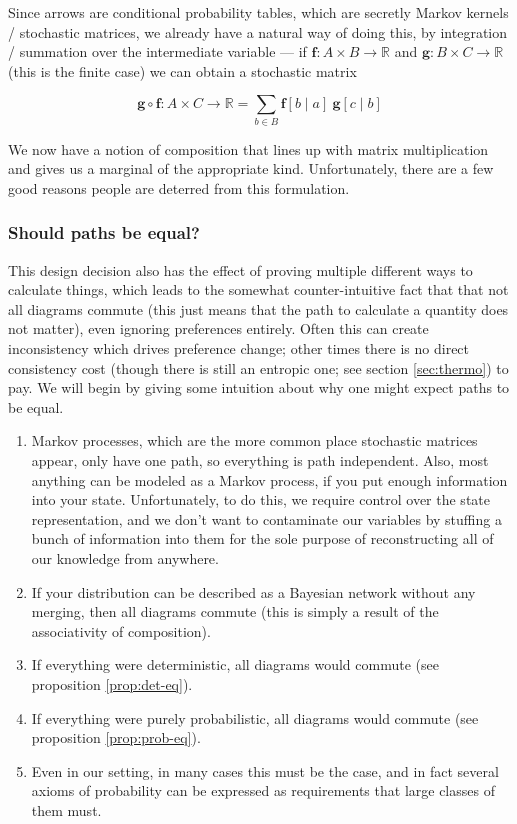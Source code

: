 \documentclass{article}
\begin{document}
	Since arrows are conditional probability tables, which are secretly Markov kernels / stochastic matrices, we already have a natural way of doing this, by integration / summation over the intermediate variable --- if $\mathbf f : A \times B \to \mathbb R$ and $\mathbf g : B \times C \to \mathbb R$ (this is the finite case) we can obtain a stochastic matrix
	
	\[\mathbf g\circ \mathbf f : A \times C \to \mathbb R =  \sum_{b \in B} \mathbf f[ b \mid a]~ \mathbf g[c \mid b] \]
	
	We now have a notion of composition that lines up with matrix multiplication and gives us a marginal of the appropriate kind. Unfortunately, there are a few good reasons people are deterred from this formulation. 
	

	
	\subsubsection{Should paths be equal?}
	
	This design decision also has the effect of proving multiple different ways to calculate things, which leads to the somewhat counter-intuitive fact that that not all diagrams commute (this just means that the path to calculate a quantity does not matter), even ignoring preferences entirely. Often this can create inconsistency which drives preference change; other times there is no direct consistency cost (though there is still an entropic one; see section \ref{sec:thermo}) to pay. We will begin by giving some intuition about why one might expect paths to be equal. 

	\begin{enumerate}
		\item Markov processes, which are the more common place stochastic matrices appear, only have one path, so everything is path independent. Also, most anything can be modeled as a Markov process, if you put enough information into your state. Unfortunately, to do this, we require control over the state representation, and we don't want to contaminate our variables by stuffing a bunch of information into them for the sole purpose of reconstructing all of our knowledge from anywhere.
		\item If your distribution can be described as a Bayesian network without any merging, then all diagrams commute (this is simply a result of the associativity of composition).
		\item If everything were deterministic, all diagrams would commute (see proposition \ref{prop:det-eq}).
		\item If everything were purely probabilistic, all diagrams would commute (see proposition \ref{prop:prob-eq}).
		\item Even in our setting, in many cases this must be the case, and in fact several axioms of probability can be expressed as requirements that large classes of them must.
	\end{enumerate}
\end{document}
